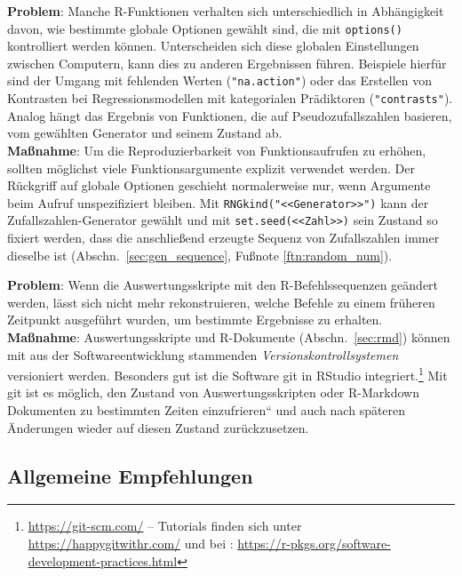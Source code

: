 \textbf{Problem}: Manche R-Funktionen verhalten sich unterschiedlich in Abhängigkeit davon, wie bestimmte globale Optionen gewählt sind, die mit \lstinline!options()! kontrolliert werden können. Unterscheiden sich diese globalen Einstellungen zwischen Computern, kann dies zu anderen Ergebnissen führen. Beispiele hierfür sind der Umgang mit fehlenden Werten (\lstinline!"na.action"!) oder das Erstellen von Kontrasten bei Regressionsmodellen mit kategorialen Prädiktoren (\lstinline!"contrasts"!). Analog hängt das Ergebnis von Funktionen, die auf Pseudozufallszahlen basieren, vom gewählten Generator und seinem Zustand ab.\\
\textbf{Maßnahme}: Um die Reproduzierbarkeit von Funktionsaufrufen zu erhöhen, sollten möglichst viele Funktionsargumente explizit verwendet werden. Der Rückgriff auf globale Optionen geschieht normalerweise nur, wenn Argumente beim Aufruf unspezifiziert bleiben. Mit  \lstinline!RNGkind("<<Generator>>")! kann der Zufallszahlen-Generator gewählt und mit  \lstinline!set.seed(<<Zahl>>)! sein Zustand so fixiert werden, dass die anschließend erzeugte Sequenz von Zufallszahlen immer dieselbe ist (Abschn.\ \ref{sec:gen_sequence}, Fußnote \ref{ftn:random_num}).

\textbf{Problem}: Wenn die Auswertungsskripte mit den R-Befehlssequenzen geändert werden, lässt sich nicht mehr rekonstruieren, welche Befehle zu einem früheren Zeitpunkt ausgeführt wurden, um bestimmte Ergebnisse zu erhalten.\\
\textbf{Maßnahme}: Auswertungsskripte und R-Dokumente (Abschn.\ \ref{sec:rmd}) können mit aus der Softwareentwicklung stammenden \emph{Versionskontrollsystemen} versioniert werden. Besonders gut ist die Software git in RStudio integriert.\footnote{\url{https://git-scm.com/} -- Tutorials finden sich unter \url{https://happygitwithr.com/} und bei : \url{https://r-pkgs.org/software-development-practices.html}} Mit git ist es möglich, den Zustand von Auswertungsskripten oder R-Markdown Dokumenten zu bestimmten Zeiten {\quotedblbase}einzufrieren{\textquotedblleft} und auch nach späteren Änderungen wieder auf diesen Zustand zurückzusetzen.

\subsection{Allgemeine Empfehlungen}

